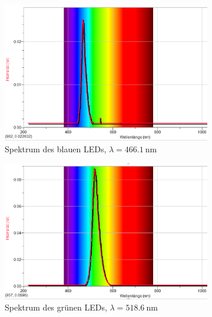 \begin{figure}[H]
    \centering
    \begin{subfigure}{.3\linewidth}
        \centering
        \includegraphics[width=\linewidth]{images/spectrum-blue.png}
        \caption{Spektrum des blauen LEDs, $\lambda=\SI{466.1}{\nano\meter}$}
        \label{fig:led-blue}
    \end{subfigure}
    \begin{subfigure}{.3\linewidth}
        \centering
        \includegraphics[width=\linewidth]{images/spectrum-green.png}
        \caption{Spektrum des gr\"unen LEDs, $\lambda=\SI{518.6}{\nano\meter}$}
        \label{fig:led-green}
    \end{subfigure}
    \begin{subfigure}{.3\linewidth}
        \centering

\end{subfigure}
\end{figure}
